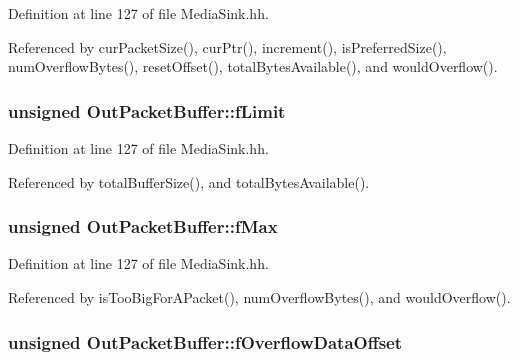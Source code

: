 Definition at line 127 of file Media\+Sink.\+hh.



Referenced by cur\+Packet\+Size(), cur\+Ptr(), increment(), is\+Preferred\+Size(), num\+Overflow\+Bytes(), reset\+Offset(), total\+Bytes\+Available(), and would\+Overflow().

\subsubsection[{f\+Limit}]{\setlength{\rightskip}{0pt plus 5cm}unsigned Out\+Packet\+Buffer\+::f\+Limit\hspace{0.3cm}{\ttfamily [private]}}\label{classOutPacketBuffer_a2f7f090be357bab06907e81fb287c518}


Definition at line 127 of file Media\+Sink.\+hh.



Referenced by total\+Buffer\+Size(), and total\+Bytes\+Available().

\subsubsection[{f\+Max}]{\setlength{\rightskip}{0pt plus 5cm}unsigned Out\+Packet\+Buffer\+::f\+Max\hspace{0.3cm}{\ttfamily [private]}}\label{classOutPacketBuffer_a5629bfc1f44082c9f9058369b4204d69}


Definition at line 127 of file Media\+Sink.\+hh.



Referenced by is\+Too\+Big\+For\+A\+Packet(), num\+Overflow\+Bytes(), and would\+Overflow().

\subsubsection[{f\+Overflow\+Data\+Offset}]{\setlength{\rightskip}{0pt plus 5cm}unsigned Out\+Packet\+Buffer\+::f\+Overflow\+Data\+Offset\hspace{0.3cm}{\ttfamily [private]}}\label{classOutPacketBuffer_a5b15e9deeec48b85148e5a1ee8815c69}


